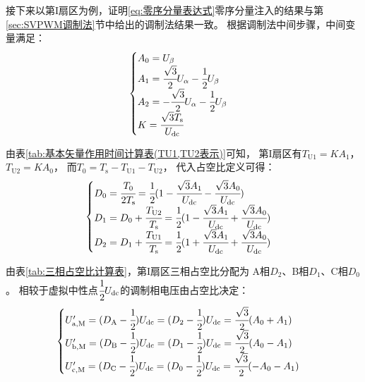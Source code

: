 接下来以第I扇区为例，证明\eqref{eq:零序分量表达式}零序分量注入的结果与第\ref{sec:SVPWM调制法}节中给出的调制法结果一致。
根据调制法中间步骤，中间变量满足：
\begin{equation*}
    \begin{cases}
        A_0 = U_{\mathrm{\beta}}\\
        A_1 = \cfrac{\sqrt{3}}{2}U_{\mathrm{\alpha}} - \cfrac{1}{2}U_{\mathrm{\beta}}\\
        A_2 = -\cfrac{\sqrt{3}}{2}U_{\mathrm{\alpha}} - \cfrac{1}{2}U_{\mathrm{\beta}}\\
        K = \cfrac{\sqrt{3}T_{\mathrm{s}}}{U_{\mathrm{dc}}}
    \end{cases}
\end{equation*}

由表\ref{tab:基本矢量作用时间计算表(TU1,TU2表示)}可知，
第I扇区有\(T_{\mathrm{U1}} = KA_1\)，\(T_{\mathrm{U2}} = KA_0\)，
而\(T_0=T_{\mathrm{s}}-T_{\mathrm{U1}}-T_{\mathrm{U2}}\)，
代入占空比定义可得：
\begin{equation*}
    \begin{cases}
        D_0=\cfrac{T_0}{2T_{\mathrm{s}}}=\cfrac{1}{2}(1-\cfrac{\sqrt{3}A_1}{U_{\mathrm{dc}}}
        -\cfrac{\sqrt{3}A_0}{U_{\mathrm{dc}}})\\
        D_1=D_0+\cfrac{T_{\mathrm{U2}}}{T_{\mathrm{s}}}=\cfrac{1}{2}(1-\cfrac{\sqrt{3}A_1}{U_{\mathrm{dc}}}
        +\cfrac{\sqrt{3}A_0}{U_{\mathrm{dc}}})\\
        D_2=D_1+\cfrac{T_{\mathrm{U1}}}{T_{\mathrm{s}}}=\cfrac{1}{2}(1+\cfrac{\sqrt{3}A_1}{U_{\mathrm{dc}}}
        +\cfrac{\sqrt{3}A_0}{U_{\mathrm{dc}}})
    \end{cases}
\end{equation*}

由表\ref{tab:三相占空比计算表}，第I扇区三相占空比分配为
A相\(D_2\)、B相\(D_1\)、C相\(D_0\)。
相较于虚拟中性点\(\cfrac{1}{2}U_{\mathrm{dc}}\)的调制相电压由占空比决定：
\begin{equation*}
    \begin{cases}
        U_{\mathrm{a,M}}' = (D_{\mathrm{A}}-\cfrac{1}{2})U_{\mathrm{dc}}=(D_{2}-\cfrac{1}{2})U_{\mathrm{dc}}
        =\cfrac{\sqrt{3}}{2}(A_0 + A_1)\\
        U_{\mathrm{b,M}}' = (D_{\mathrm{B}}-\cfrac{1}{2})U_{\mathrm{dc}}=(D_{1}-\cfrac{1}{2})U_{\mathrm{dc}}
        =\cfrac{\sqrt{3}}{2}(A_0 - A_1)\\
        U_{\mathrm{c,M}}' = (D_{\mathrm{C}}-\cfrac{1}{2})U_{\mathrm{dc}}=(D_{0}-\cfrac{1}{2})U_{\mathrm{dc}}
        =\cfrac{\sqrt{3}}{2}(-A_0 - A_1)
    \end{cases}
\end{equation*}

